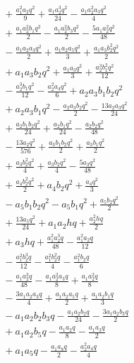 \begin{align*}
&{}+ \frac{a_{1}^{2} a_{2} q^{2}}{9} + \frac{a_{1} a_{2}^{3} q^{2}}{24} - \frac{a_{1} a_{2}^{2} a_{3} q^{2}}{4}\\
&{}+ \frac{a_{1} a_{2}^{2} b_{1} q^{2}}{2} - \frac{a_{1} a_{2}^{2} b_{3} q^{2}}{2} - \frac{5 a_{1} a_{2}^{2} q^{2}}{48}\\
&{}- \frac{a_{1} a_{2} a_{3} q^{2}}{2} + \frac{a_{1} a_{2} a_{5} q^{2}}{3} + \frac{a_{1} a_{3} b_{2}^{2} q^{2}}{2}\\
&{}+ a_{1} a_{3} b_{2} q^{2} + \frac{a_{1} a_{3} q^{2}}{3} + \frac{a_{2}^{3} b_{1}^{2} q^{2}}{12}\\
&{}- \frac{a_{2}^{3} b_{1} q^{2}}{12} - \frac{a_{2}^{2} a_{4} q^{2}}{6} + a_{2} a_{3} b_{1} b_{2} q^{2}\\
&{}+ a_{2} a_{3} b_{1} q^{2} - \frac{a_{2} a_{3} b_{2} q^{2}}{2} - \frac{13 a_{2} a_{3} q^{2}}{24}\\
&{}+ \frac{a_{2} b_{1} b_{2} q^{2}}{24} + \frac{a_{2} b_{1} q^{2}}{24} - \frac{a_{2} b_{2} q^{2}}{48}\\
&{}- \frac{13 a_{2} q^{2}}{576} + \frac{a_{3} b_{1} b_{2} q^{2}}{2} + \frac{a_{3} b_{1} q^{2}}{2}\\
&{}+ \frac{a_{3} b_{2}^{2} q^{2}}{4} + \frac{a_{3} b_{2} q^{2}}{4} - \frac{5 a_{3} q^{2}}{48}\\
&{}+ \frac{a_{4} b_{2}^{2} q^{2}}{2} + a_{4} b_{2} q^{2} + \frac{a_{4} q^{2}}{3}\\
&{}- a_{5} b_{1} b_{2} q^{2} - a_{5} b_{1} q^{2} + \frac{a_{5} b_{2} q^{2}}{2}\\
&{}+ \frac{13 a_{5} q^{2}}{24} + a_{1} a_{2} h q + \frac{a_{2}^{2} h q}{2}\\
&{}+ a_{3} h q + \frac{a_{1}^{2} a_{2}^{3} q}{48} - \frac{a_{1}^{2} a_{2} q}{12}\\
&{}- \frac{a_{1}^{2} b_{2}^{3} q}{12} - \frac{a_{1}^{2} b_{2}^{2} q}{4} - \frac{a_{1}^{2} b_{2} q}{6}\\
&{}- \frac{a_{1} a_{2}^{3} q}{48} - \frac{a_{1} a_{2}^{2} a_{3} q}{8} + \frac{a_{1} a_{2}^{2} q}{8}\\
&{}- \frac{3 a_{1} a_{2} a_{3} q}{4} + \frac{a_{1} a_{2} a_{5} q}{2} + \frac{a_{1} a_{2} b_{1} q}{3}\\
&{}- a_{1} a_{2} b_{2} b_{3} q - \frac{a_{1} a_{2} b_{2} q}{24} - \frac{3 a_{1} a_{2} b_{3} q}{2}\\
&{}+ a_{1} a_{2} b_{5} q - \frac{a_{1} a_{2} q}{8} - \frac{a_{1} a_{3} q}{2}\\
&{}+ a_{1} a_{5} q - \frac{a_{1} a_{8} q}{2} - \frac{a_{2}^{2} a_{4} q}{4}\\

\end{align*}
